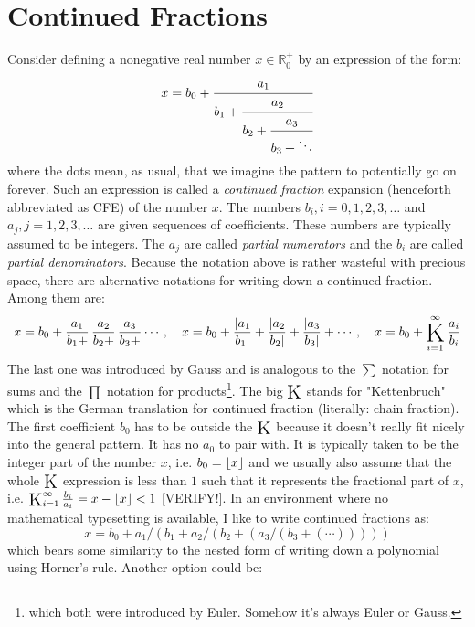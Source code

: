 \section{Continued Fractions}
Consider defining a nonegative real number $x \in \mathbb{R}_0^+$ by an expression of the form:
\begin{equation}
\label{Eq:ContinuedFraction}
x = b_0 + \cfrac{a_1}{b_1 + \cfrac{a_2}{b_2 + \cfrac{a_3}{b_3 + \ddots }}}
\end{equation}
where the dots mean, as usual, that we imagine the pattern to potentially go on forever. Such an expression is called a \emph{continued fraction} expansion (henceforth abbreviated as CFE) of the number $x$. The numbers $b_i, i = 0,1,2,3,\ldots$ and $a_j, j = 1,2,3,\ldots$ are given sequences of coefficients. These numbers are typically assumed to be integers. The $a_j$ are called \emph{partial numerators} and the $b_i$ are called \emph{partial denominators}. Because the notation above is rather wasteful with precious space, there are alternative notations for writing down a continued fraction. Among them are:
\begin{equation}
x = b_0 + \frac{a_1}{b_1 +} \, \frac{a_2}{b_2 +} \, \frac{a_3}{b_3 +} \cdots, \quad
x = b_0 + \frac{|a_1}{b_1|} + \frac{|a_2}{b_2|} + \frac{|a_3}{b_3|} + \cdots, \quad
x = b_0 + \opK_{i=1}^{\infty} \frac{a_i}{b_i}
\end{equation}
The last one was introduced by Gauss and is analogous to the $\sum$ notation for sums and the $\prod$ notation for products\footnote{which both were introduced by Euler. Somehow it's always Euler or Gauss.}. The big $\opK$ stands for "Kettenbruch" which is the German translation for continued fraction (literally: chain fraction). The first coefficient $b_0$ has to be outside the $\opK$ because it doesn't really fit nicely into the general pattern. It has no $a_0$ to pair with. It is typically taken to be the integer part of the number $x$, i.e. $b_0 =\lfloor x\rfloor$ and we usually also assume that the whole $\opK$ expression is less than $1$ such that it represents the fractional part of $x$, i.e. $\opK_{i=1}^{\infty} \frac{b_i}{a_i} = x - \floor{x} < 1$ [VERIFY!]. In an environment where no mathematical typesetting is available, I like to write continued fractions as:
\begin{equation}
x = b_0 + a_1 / (b_1 + a_2 / (b_2 + (a_3 /  (b_3 + (\cdots))))) 
\end{equation}
which bears some similarity to the nested form of writing down a polynomial using Horner's rule. Another option could be:
